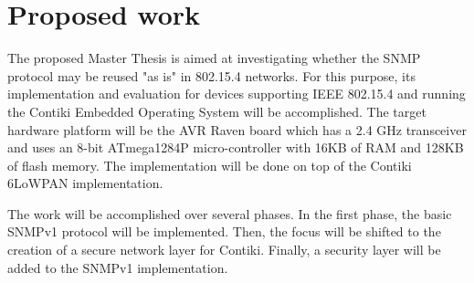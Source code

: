 \documentclass[12pt, titlepage, a4paper]{report}
\begin{document}


 

\chapter{Proposed work}\label{ch:proposal}

The proposed Master Thesis is aimed at investigating whether the SNMP protocol may be reused "as is" in 802.15.4 networks. For this purpose, its implementation and evaluation for devices supporting IEEE 802.15.4 and running the Contiki Embedded Operating System \cite{contiki} will be accomplished. The target hardware platform will be the AVR Raven board which has a 2.4 GHz transceiver and uses an 8-bit ATmega1284P micro-controller with 16KB of RAM and 128KB of flash memory. The implementation will be done on top of the Contiki 6LoWPAN implementation.

The work will be accomplished over several phases. In the first phase, the basic SNMPv1 protocol will be implemented. Then, the focus will be shifted to the creation of a secure network layer for Contiki. Finally, a security layer will be added to the SNMPv1 implementation.



\newpage



\nocite{ieee802.15.4}
\nocite{eui64}
\nocite{rfc780}
\nocite{rfc2460}
\nocite{rfc2464}
\nocite{rfc2474}
\nocite{rfc3168}
\nocite{rfc3775}
\nocite{rfc4191}
\nocite{rfc4291}
\nocite{rfc4443}
\nocite{rfc4861}
\nocite{rfc4862}
\nocite{rfc4919}
\nocite{rfc4944}
\nocite{draft-usecases-05}
\nocite{draft-hc-06}
\nocite{draft-nd-07}
\nocite{draft-routing-04}
\nocite{draft-protocols-07}
\nocite{draft-rpl-04}
\nocite{draft-routing-metrics-04}
\nocite{rfc1157}
\nocite{rfc1901}
\nocite{rfc1908}
\nocite{rfc3411}
\nocite{rfc3418}
\end{document}
